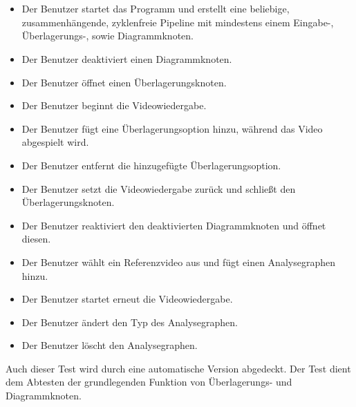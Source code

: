\paragraph{} ~\\
 
\begin{itemize}
	\item Der Benutzer startet das Programm und erstellt eine beliebige, zusammenhängende, zyklenfreie Pipeline mit mindestens einem Eingabe-, Überlagerungs-, sowie Diagrammknoten.
	\item Der Benutzer deaktiviert einen Diagrammknoten.
	\item Der Benutzer öffnet einen Überlagerungsknoten.
	\item Der Benutzer beginnt die Videowiedergabe.
	\item Der Benutzer fügt eine Überlagerungsoption hinzu, während das Video abgespielt wird.
	\item Der Benutzer entfernt die hinzugefügte Überlagerungsoption.
	\item Der Benutzer setzt die Videowiedergabe zurück und schließt den Überlagerungsknoten.
	\item Der Benutzer reaktiviert den deaktivierten Diagrammknoten und öffnet diesen.
	\item Der Benutzer wählt ein Referenzvideo aus und fügt einen Analysegraphen hinzu.
	\item Der Benutzer startet erneut die Videowiedergabe.
	\item Der Benutzer ändert den Typ des Analysegraphen.
	\item Der Benutzer löscht den Analysegraphen.
\end{itemize}
Auch dieser Test wird durch eine automatische Version abgedeckt. Der Test dient dem Abtesten der grundlegenden Funktion von Überlagerungs- und Diagrammknoten.
